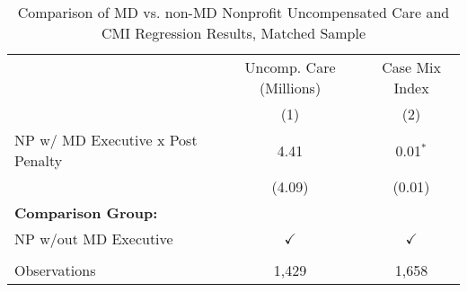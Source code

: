 \begin{table}[htbp]
   \caption{\label{tab:MD_noMD_uncomp_CMI_matchsample} Comparison of MD vs. non-MD Nonprofit Uncompensated Care and CMI Regression Results, Matched Sample}
   \bigskip
   \centering
   \begin{tabular}{lcc}
      \toprule
                                        & Uncomp. Care (Millions) & Case Mix Index\\  
                                        & (1)                     & (2)\\  
      \midrule 
      NP w/ MD Executive x Post Penalty & 4.41                    & 0.01$^{*}$\\   
                                        & (4.09)                  & (0.01)\\   
      \textbf{Comparison Group:}        &                         & \\  
      NP w/out MD Executive             & $\checkmark$            & $\checkmark$\\   
       \\
      Observations                      & 1,429                   & 1,658\\  
      \bottomrule
   \end{tabular}
\end{table}
